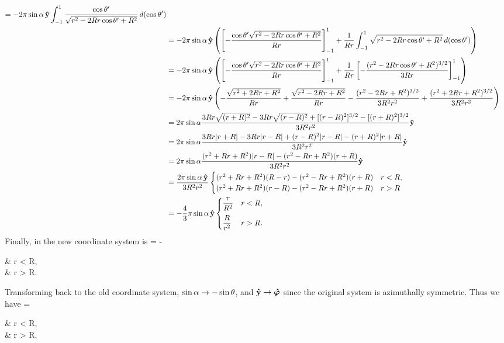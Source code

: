 \begin{solution}
\begin{align*}
		= -2\pi \sin\alpha \,\vb{\hat{y}} \int_{-1}^1 \frac{\cos\theta'}{\sqrt{r^2 - 2 R r  \cos\theta' + R^2}} \dd{(\cos\theta')} \\
		&= -2\pi \sin\alpha \,\vb{\hat{y}} \left( \left[ -\frac{\cos\theta' \sqrt{r^2 - 2 R r \cos\theta' + R^2}}{R r} \right]_{-1}^1 + \frac{1}{R r} \int_{-1}^1 \sqrt{r^2 - 2 R r \cos\theta' + R^2} \dd{(\cos\theta')} \right) \\
		&= -2\pi \sin\alpha \,\vb{\hat{y}} \left( \left[ -\frac{\cos\theta' \sqrt{r^2 - 2 R r \cos\theta' + R^2}}{R r} \right]_{-1}^1 + \frac{1}{R r} \left[ -\frac{(r^2 - 2 R r \cos\theta' + R^2)^{3/2}}{3 R r} \right]_{-1}^1\right) \\
		&= -2\pi \sin\alpha \,\vb{\hat{y}} \left( -\frac{\sqrt{r^2 + 2 R r + R^2}}{R r} + \frac{\sqrt{r^2 - 2 R r + R^2}}{R r} - \frac{(r^2 - 2 R r + R^2)^{3/2}}{3 R^2 r^2} + \frac{(r^2 + 2 R r + R^2)^{3/2}}{3 R^2 r^2} \right) \\
		&= 2\pi \sin\alpha \frac{3 R r \sqrt{(r + R)^2} - 3 R r \sqrt{(r - R)^2} + [(r - R)^2]^{3/2} - [(r + R)^2]^{3/2}}{3 R^2 r^2} \vb{\hat{y}} \\
		&= 2\pi \sin\alpha \frac{3 R r \abs{r + R} - 3 R r \abs{r - R} + (r - R)^2 \abs{r - R} - (r + R)^2 \abs{r + R}}{3 R^2 r^2} \vb{\hat{y}} \\
		&= 2\pi \sin\alpha \frac{(r^2 + R r + R^2) \abs{r - R} - (r^2 - R r + R^2) (r + R)}{3 R^2 r^2} \vb{\hat{y}} \\
		&= \frac{2\pi \sin\alpha \, \vb{\hat{y}}}{3 R^2 r^2} \begin{cases}
			(r^2 + R r + R^2) (R - r) - (r^2 - R r + R^2) (r + R) & r < R, \\
			(r^2 + R r + R^2) (r - R) - (r^2 - R r + R^2) (r + R) & r > R
		\end{cases} \\
		&= -\frac{4}{3} \pi \sin\alpha \, \vb{\hat{y}} \begin{cases}
			\dfrac{r}{R^2} & r < R, \\[2ex]
			\dfrac{R}{r^2} & r > R.
		\end{cases}
	\end{align*}
	Finally, in the new coordinate system  is
	\beq
		\vAx = - \sin\alp \,\yh \begin{cases}
			 & r < R, \\[2ex]
			 & r > R.
		\end{cases}
	\eeq
	
	Transforming back to the old coordinate system, $\sin\alpha \to - \sin\theta$, and $\vb{\hat{y}} \to \boldsymbol{\hat{\varphi}}$ since the original system is azimuthally symmetric.  Thus we have
	\beq
		\vAx =  \sin\tht \,\phh \begin{cases}
			 & r < R, \\[2ex]
			 & r > R.
		\end{cases}
	\eeq
	

\end{solution}
